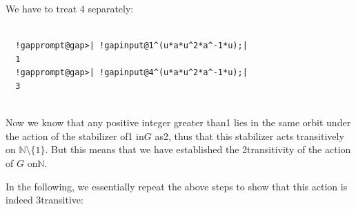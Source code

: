 \documentclass[a4paper,11pt]{report}
\begin{document}
{{\begin{Verbatim}[commandchars=!@|,fontsize=\small,frame=single,label=Example]
\end{Verbatim}
 We have to treat 4 separately: 
\begin{Verbatim}[commandchars=!@|,fontsize=\small,frame=single,label=Example]
  
  !gapprompt@gap>| !gapinput@1^(u*a*u^2*a^-1*u);|
  1
  !gapprompt@gap>| !gapinput@4^(u*a*u^2*a^-1*u);|
  3
  
\end{Verbatim}
 Now we know that any positive integer greater than{\nobreakspace}1 lies in the
same orbit under the action of the stabilizer of{\nobreakspace}1
in{\nobreakspace}$G$ as{\nobreakspace}2, thus that this stabilizer acts transitively on ${\ensuremath{\mathbb N}} \setminus \{1\}$. But this means that we have established the
2\texttt{}transitivity of the action of $G$ on{\nobreakspace}{\ensuremath{\mathbb N}}. 

 In the following, we essentially repeat the above steps to show that this
action is indeed 3\texttt{}transitive: 
\begin{Verbatim}[commandchars=!@|,fontsize=\small,frame=single,label=Example]
  

\end{Verbatim}}}
\end{document}
